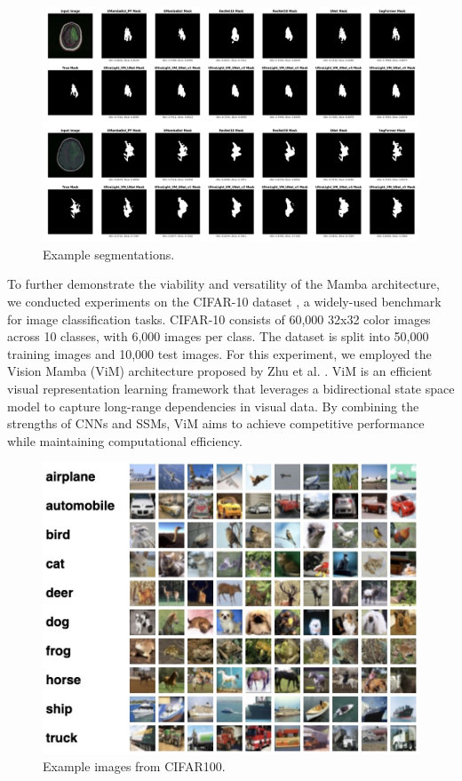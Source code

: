 \documentclass[conference]{IEEEtran}
\begin{document}
\begin{figure}[!t]
    \centering
    \includegraphics[width=\columnwidth]{imgs/masks.png}
    \caption{Example segmentations.}
    \label{fig:segs}
\end{figure}

To further demonstrate the viability and versatility of the Mamba architecture, we conducted experiments on the CIFAR-10 dataset \cite{krizhevsky2009learning}, a widely-used benchmark for image classification tasks. CIFAR-10 consists of 60,000 32x32 color images across 10 classes, with 6,000 images per class. The dataset is split into 50,000 training images and 10,000 test images.
For this experiment, we employed the Vision Mamba (ViM) architecture proposed by Zhu et al. \cite{zhu2024vision}. ViM is an efficient visual representation learning framework that leverages a bidirectional state space model to capture long-range dependencies in visual data. By combining the strengths of CNNs and SSMs, ViM aims to achieve competitive performance while maintaining computational efficiency.

\begin{figure}[!t]
    \centering
    \includegraphics[width=\columnwidth]{imgs/cifar_10.jpg}
    \caption{Example images from CIFAR100.}
    \label{fig:cifar}
\end{figure}
\end{document}
